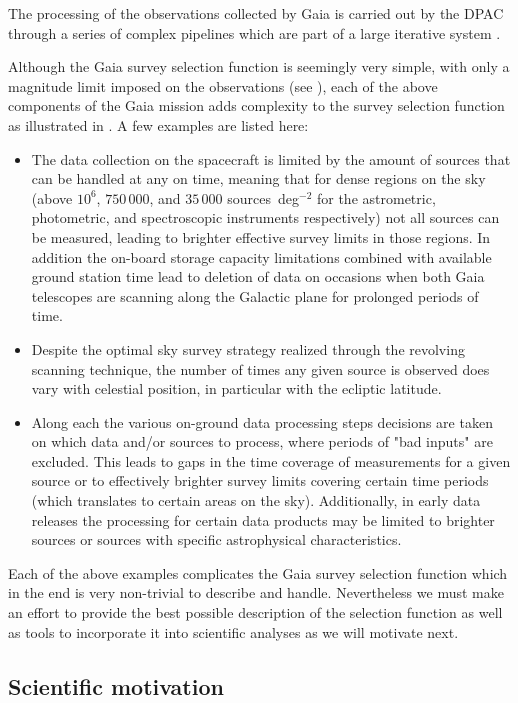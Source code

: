 The processing of the observations collected by Gaia is carried out by the DPAC through a series of complex pipelines which are part of a large iterative system \citep[see section 7 in][]{2016A&A...595A...1G}.

Although the Gaia survey selection function is seemingly very simple, with only a magnitude limit imposed on the observations (see ), each of the above components of the Gaia mission adds complexity to the survey selection function as illustrated in . A few examples are listed here:
\begin{itemize}
    \item The data collection on the spacecraft is limited by the amount of sources that can be handled at any on time, meaning that for dense regions on the sky (above $10^6$, $750\,000$, and $35\,000$ sources~deg$^{-2}$ for the astrometric, photometric, and spectroscopic instruments respectively) not all sources can be measured, leading to brighter effective survey limits in those regions. In addition the on-board storage capacity limitations combined with available ground station time lead to deletion of data on occasions when both Gaia telescopes are scanning along the Galactic plane for prolonged periods of time.
    \item Despite the optimal sky survey strategy realized through the revolving scanning technique, the number of times any given source is observed does vary with celestial position, in particular with the ecliptic latitude.
    \item Along each the various on-ground data processing steps decisions are taken on which data and/or sources to process, where periods of "bad inputs" are excluded. This leads to gaps in the time coverage of measurements for a given source or to effectively brighter survey limits covering certain time periods (which translates to certain areas on the sky). Additionally, in early data releases the processing for certain data products may be limited to brighter sources or sources with specific astrophysical characteristics.
\end{itemize}
Each of the above examples complicates the Gaia survey selection function which in the end is very non-trivial to describe and handle. Nevertheless we must make an effort to provide the best possible description of the selection function as well as tools to incorporate it into scientific analyses as we will motivate next.

\subsection{Scientific motivation}
\label{sec:scientific-motivation}

